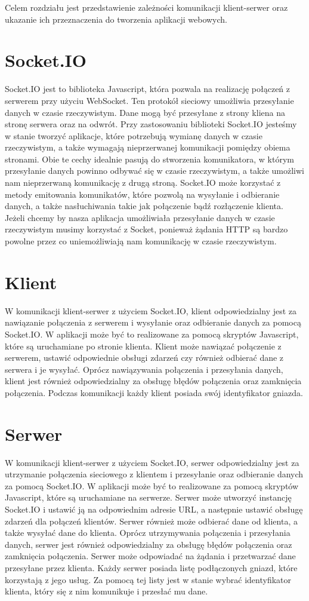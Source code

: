 Celem rozdziału jest przedstawienie zależności komunikacji klient-serwer oraz ukazanie ich przeznaczenia do tworzenia aplikacji webowych. 
\section{Socket.IO}
Socket.IO jest to biblioteka Javascript, która pozwala na realizację połączeń z serwerem przy użyciu WebSocket. Ten protokół sieciowy umożliwia przesyłanie danych w czasie rzeczywistym. Dane mogą być przesyłane z strony kliena na stronę serwera oraz na odwrót. Przy zastosowaniu biblioteki Socket.IO jesteśmy w stanie tworzyć aplikacje, które potrzebują wymianę danych w czasie rzeczywistym, a także wymagają nieprzerwanej komunikacji pomiędzy obiema stronami. Obie te cechy idealnie pasują do stworzenia komunikatora, w którym przesyłanie danych powinno odbywać się w czasie rzeczywistym, a także umożliwi nam nieprzerwaną komunikację z drugą stroną. Socket.IO może korzystać z metody emitowania komunikatów, które pozwolą na wysyłanie i odbieranie danych, a także nasłuchiwania takie jak połączenie bądź rozłączenie klienta. Jeżeli chcemy by nasza aplikacja umożliwiała przesyłanie danych w czasie rzeczywistym musimy korzystać z Socket, ponieważ żądania HTTP są bardzo powolne przez co uniemożliwiają nam komunikację w czasie rzeczywistym.
\section{Klient}
W komunikacji klient-serwer z użyciem Socket.IO, klient odpowiedzialny jest za nawiązanie połączenia z serwerem i wysyłanie oraz odbieranie danych za pomocą Socket.IO. W aplikacji może być to realizowane za pomocą skryptów Javascript, które są uruchamiane po stronie klienta. Klient może nawiązać połączenie z serwerem, ustawić odpowiednie obsługi zdarzeń czy również odbierać dane z serwera i je wysyłać. Oprócz nawiązywania połączenia i przesyłania danych, klient jest również odpowiedzialny za obsługę błędów połączenia oraz zamknięcia połączenia. Podczas komunikacji każdy klient posiada swój identyfikator gniazda.
\section{Serwer}
W komunikacji klient-serwer z użyciem Socket.IO, serwer odpowiedzialny jest za utrzymanie połączenia sieciowego z klientem i przesyłanie oraz odbieranie danych za pomocą Socket.IO. W aplikacji może być to realizowane za pomocą skryptów Javascript, które są uruchamiane na serwerze. Serwer może utworzyć instancję Socket.IO i ustawić ją na odpowiednim adresie URL, a następnie ustawić obsługę zdarzeń dla połączeń klientów. Serwer również może odbierać dane od klienta, a także wysyłać dane do klienta. Oprócz utrzymywania połączenia i przesyłania danych, serwer jest również odpowiedzialny za obsługę błędów połączenia oraz zamknięcia połączenia. Serwer może odpowiadać na żądania i przetwarzać dane przesyłane przez klienta. Każdy serwer posiada listę podłączonych gniazd, które korzystają z jego usług. Za pomocą tej listy jest w stanie wybrać identyfikator klienta, który się z nim komunikuje i przesłać mu dane.
